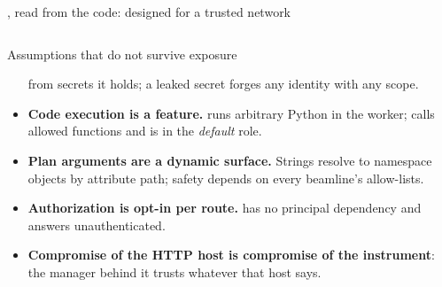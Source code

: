 \begin{frame}{\legacy{}, read from the code: designed for a trusted network}
\begin{columns}[T]
\begin{column}{0.64\textwidth}
\begin{alertblock}{Assumptions that do not survive exposure}
\begin{itemize}
                          from secrets it holds; a leaked secret forges any identity with any scope.
                    \item \textbf{Code execution is a feature.}  runs arbitrary Python in the
                          worker;  calls allowed functions and is in the \emph{default}
                           role. 
                    \item \textbf{Plan arguments are a dynamic surface.} Strings resolve to namespace objects by
                          attribute path; safety depends on every beamline's allow-lists. 
                    \item \textbf{Authorization is opt-in per route.}  has no principal
                          dependency and answers unauthenticated. 
                    \item \textbf{Compromise of the HTTP host is compromise of the instrument}: the
                          manager behind it trusts whatever that host says.
                \end{itemize}
            \end{alertblock}
        \end{column}
    \end{columns}
\end{frame}

